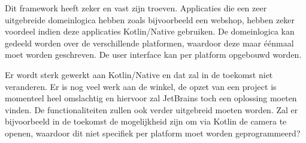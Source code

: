 Dit framework heeft zeker en vast zijn troeven. Applicaties die een zeer uitgebreide domeinlogica hebben zoals bijvoorbeeld een webshop, hebben zeker voordeel indien deze applicaties Kotlin/Native gebruiken. De domeinlogica kan gedeeld worden over de verschillende platformen, waardoor deze maar éénmaal moet worden geschreven. De user interface kan per platform opgebouwd worden. 

Er wordt sterk gewerkt aan Kotlin/Native en dat zal in de toekomst niet veranderen. Er is nog veel werk aan de winkel, de opzet van een project is momenteel heel omslachtig en hiervoor zal JetBrains toch een oplossing moeten vinden. De functionaliteiten zullen ook verder uitgebreid moeten worden. Zal er bijvoorbeeld in de toekomst de mogelijkheid zijn om via Kotlin de camera te openen, waardoor dit niet specifiek per platform moet worden geprogrammeerd?
